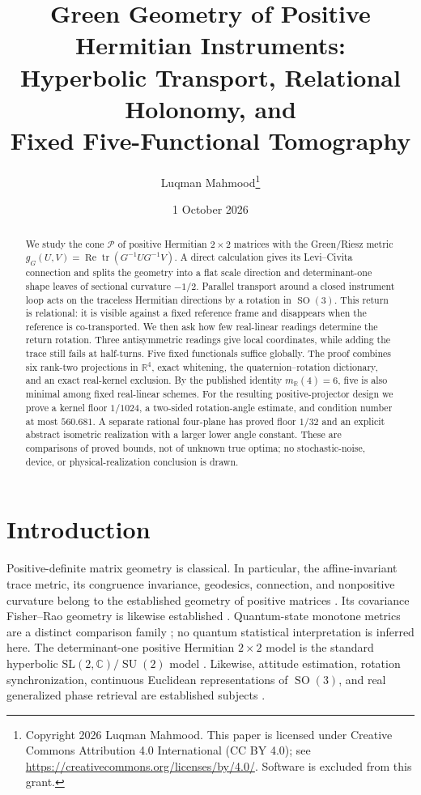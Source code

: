 \documentclass[12pt]{article}
\title{Green Geometry of Positive Hermitian Instruments:\\
Hyperbolic Transport, Relational Holonomy, and\\
Fixed Five-Functional Tomography}
\author{Luqman Mahmood\thanks{Copyright 2026 Luqman Mahmood. This paper is licensed under Creative Commons Attribution 4.0 International (CC BY 4.0); see \url{https://creativecommons.org/licenses/by/4.0/}. Software is excluded from this grant.}}
\date{1 October 2026}
\theoremstyle{definition}
\theoremstyle{remark}
\newcommand{\RR}{\mathbb R}
\newcommand{\CC}{\mathbb C}
\newcommand{\Pos}{\mathcal P}
\newcommand{\SO}{\operatorname{SO}}
\newcommand{\SU}{\operatorname{SU}}
\newcommand{\tr}{\operatorname{tr}}
\begin{document}
\maketitle

\begin{abstract}
We study the cone $\Pos$ of positive Hermitian $2\times2$ matrices with the
Green/Riesz metric
$g_G(U,V)=\operatorname{Re}\tr(G^{-1}UG^{-1}V)$.  A direct calculation gives
its Levi--Civita connection and splits the geometry into a flat scale
direction and determinant-one shape leaves of sectional curvature $-1/2$.
Parallel transport around a closed instrument loop acts on the traceless
Hermitian directions by a rotation in $\SO(3)$.  This return is relational: it
is visible against a fixed reference frame and disappears when the reference
is co-transported.  We then ask how few real-linear readings determine the
return rotation.  Three antisymmetric readings give local coordinates, while
adding the trace still fails at half-turns.  Five fixed functionals suffice
globally.  The proof combines six rank-two projections in $\RR^4$, exact
whitening, the quaternion--rotation dictionary, and an exact real-kernel
exclusion.  By the published identity $m_{\RR}(4)=6$, five is also
minimal among fixed real-linear schemes.  For the resulting positive-projector
design we prove a kernel floor $1/1024$, a two-sided rotation-angle estimate,
and condition number at most $560.681$.  A separate rational four-plane has
proved floor $1/32$ and an explicit abstract isometric realization with a
larger lower angle constant.  These are comparisons of proved bounds, not of
unknown true optima; no stochastic-noise, device, or physical-realization conclusion is
drawn.
\end{abstract}

\section{Introduction}\label{sec:introduction}

Positive-definite matrix geometry is classical.  In particular, the
affine-invariant trace metric, its congruence invariance, geodesics, connection,
and nonpositive curvature belong to the established geometry of positive
matrices
\cite{PennecFillardAyache2006,Moakher2005,Bhatia2007,
ThanwerdasPennec2023,HiaiPetz2009,BhatiaHolbrook2006}.  Its covariance
Fisher--Rao geometry is likewise established
\cite{Skovgaard1984,AmariNagaoka2000,LengletEtAl2006}.  Quantum-state
monotone metrics are a distinct comparison family
\cite{PetzSudar1996}; no quantum statistical interpretation is inferred here.
The determinant-one
positive Hermitian $2\times2$ model is the standard hyperbolic
$\mathrm{SL}(2,\CC)/\SU(2)$ model \cite{Bryant1987}.  Likewise, attitude
estimation, rotation synchronization, continuous Euclidean representations
of $\SO(3)$, and real generalized phase retrieval are established subjects
\cite{Wahba1965,WangSinger2013,ZhouEtAl2019,Xu2018,WangXu2019}.
\end{document}
